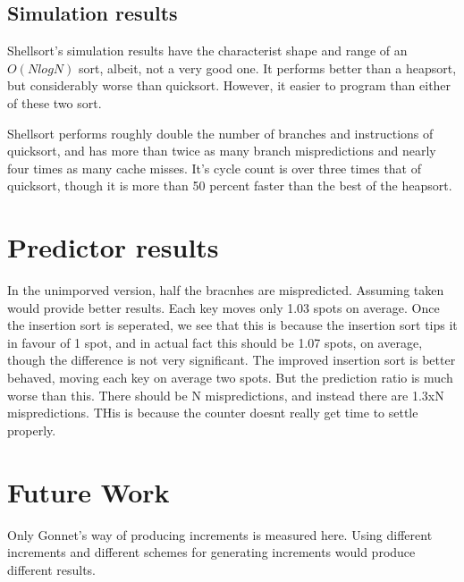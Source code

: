\subsection{Simulation results}

Shellsort's simulation results have the characterist shape and range of an
$O(NlogN)$ sort, albeit, not a very good one. It performs better than a
heapsort, but considerably worse than quicksort. However, it easier to program
than either of these two sort.

Shellsort performs roughly double the number of branches and instructions of
quicksort, and has more than twice as many branch mispredictions and nearly
four times as many cache misses. It's cycle count is over three times that of
quicksort, though it is more than 50 percent faster than the best of the
heapsort. 

\section{Predictor results}



In the unimporved version, half the bracnhes are mispredicted. Assuming taken would provide better results. Each key moves only 1.03 spots on average. Once the insertion sort is seperated, we see that this is because the insertion sort tips it in favour of 1 spot, and in actual fact this should be 1.07 spots, on average, though the difference is not very significant. The improved insertion sort is better behaved, moving each key on average two spots. But the prediction ratio is much worse than this. There should be N mispredictions, and instead there are 1.3xN mispredictions. THis is because the counter doesnt really get time to settle properly.



\section{Future Work}
Only Gonnet's way of producing increments is measured here. Using different
increments and different schemes for generating increments would produce
different results. 
